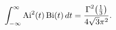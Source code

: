 \[\int_{-\infty}^{\infty}{\mathop{\mathrm{Ai}\/}\nolimits^{2}}\!\left(t\right)%
\mathop{\mathrm{Bi}\/}\nolimits\!\left(t\right)dt=\frac{{\mathop{\Gamma\/}%
\nolimits^{2}}\!\left(\frac{1}{3}\right)}{4\sqrt{3}\pi^{2}}.\]